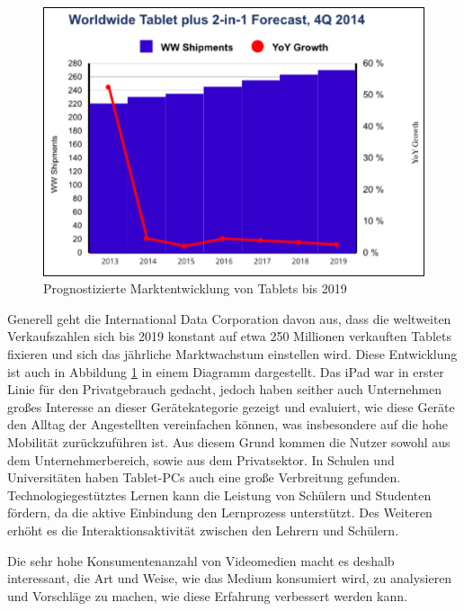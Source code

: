 \documentclass[11pt,a4paper]{report}
\begin{document}
\begin{figure}[h]
\begin{center}
\includegraphics[scale=0.9]{./images/41.png}
\caption{Prognostizierte Marktentwicklung von Tablets bis 2019 \cite{IDCMarketdevelopment}}
\label{marktentwicklung}
\end{center}
\end{figure}
Generell geht die International Data Corporation davon aus, dass die weltweiten Verkaufszahlen sich bis 2019 konstant auf etwa 250 Millionen verkauften Tablets fixieren und sich das jährliche Marktwachstum einstellen wird. Diese Entwicklung ist auch in Abbildung \ref{marktentwicklung} in einem Diagramm dargestellt. \cite{IDCMarketdevelopment}
Das iPad war in erster Linie für den Privatgebrauch gedacht, jedoch haben seither auch Unternehmen großes Interesse an dieser Gerätekategorie gezeigt und evaluiert, wie diese Geräte den Alltag der Angestellten vereinfachen können, was insbesondere auf die hohe Mobilität zurückzuführen ist. Aus diesem Grund kommen die Nutzer sowohl aus dem Unternehmerbereich, sowie aus dem Privatsektor. In Schulen und Universitäten haben Tablet-PCs auch eine große Verbreitung gefunden. Technologiegestütztes Lernen kann die Leistung von Schülern und Studenten fördern, da die aktive Einbindung den Lernprozess unterstützt. Des Weiteren erhöht es die Interaktionsaktivität zwischen den Lehrern und Schülern. \cite{fischer2012potential}

Die sehr hohe Konsumentenanzahl von Videomedien macht es deshalb interessant, die Art und Weise, wie das Medium konsumiert wird, zu analysieren und Vorschläge zu machen, wie diese Erfahrung verbessert werden kann.
\end{document}

